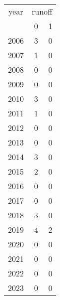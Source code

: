 \footnotesize\begin{tabular}[t]{lrr}
\toprule
\multicolumn{1}{c}{year} & \multicolumn{2}{c}{runoff} \\
\cmidrule(l{3pt}r{3pt}){1-1} \cmidrule(l{3pt}r{3pt}){2-3}
  & 0 & 1\\
\midrule
2006 & 3 & 0\\
2007 & 1 & 0\\
2008 & 0 & 0\\
2009 & 0 & 0\\
2010 & 3 & 0\\
2011 & 1 & 0\\
2012 & 0 & 0\\
2013 & 0 & 0\\
2014 & 3 & 0\\
2015 & 2 & 0\\
2016 & 0 & 0\\
2017 & 0 & 0\\
2018 & 3 & 0\\
2019 & 4 & 2\\
2020 & 0 & 0\\
2021 & 0 & 0\\
2022 & 0 & 0\\
2023 & 0 & 0\\
\bottomrule
\end{tabular}
